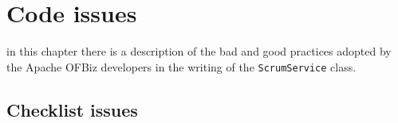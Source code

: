 \documentclass{scrreprt}
\begin{document}
\chapter{Code issues}
in this chapter there is a description of the bad and good practices adopted by the Apache OFBiz developers in the writing of the \texttt{ScrumService} class.

\section{Checklist issues}

\begin{comment}

\begin{itemize}
\item [line 18] is longer than 80 characters: it is 81;
\item [line 51] the name \texttt{module} is not compliant with the constant pattern: is should be \texttt{MODULE};
\item [line 52] the name \texttt{resource} is not compliant with the constant pattern: is should be \texttt{RESOURCE};
\item [line 53] it is longer than 80 characters: it is 113;
\item [line 53] parameter\texttt{ctx} should be final;
\item [line 53] parameter \texttt{context} should be final;
\item [line 55] the typecast is not followed by whitespace;
\item [line 57] is longer than 80 characters: it is 83;
\item [line 58] is longer than 80 characters: it is 88;
\item [line 62] is longer than 80 characters and also longer than 120: it is 167;
\item [line 70] is longer than 80 characters and also longer than 120: it is 128;
\item [line 73] is longer than 80 characters: it is 99;
\item [line 74] is longer than 80 characters and also longer than 120: it is 134;
\item [line 75] is longer than 80 characters and also longer than 120: it is 135;
\item [line 77] is longer than 80 characters and also longer than 120: it is 224;
\item [line 78] is longer than 80 characters: it is 89;
\item [line 79] is longer than 80 characters and also longer than 120: it is 212;

\end{comment}
\end{document}
